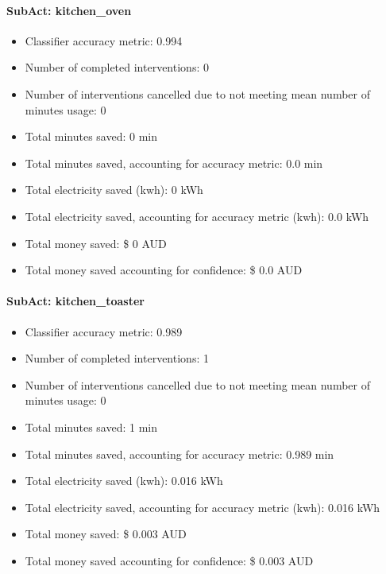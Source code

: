 \documentclass[11pt,]{article}
\providecommand{\tightlist}{%
  \setlength{\itemsep}{0pt}\setlength{\parskip}{0pt}}
\let\oldparagraph\paragraph
\renewcommand{\paragraph}[1]{\oldparagraph{#1}\mbox{}}
\begin{document}
\hypertarget{subact-kitchen_oven}{%
\paragraph{SubAct: kitchen\_oven}\label{subact-kitchen_oven}}

\begin{itemize}
\tightlist
\item
  Classifier accuracy metric: 0.994
\item
  Number of completed interventions: 0
\item
  Number of interventions cancelled due to not meeting mean number of
  minutes usage: 0
\item
  Total minutes saved: 0 min
\item
  Total minutes saved, accounting for accuracy metric: 0.0 min
\item
  Total electricity saved (kwh): 0 kWh
\item
  Total electricity saved, accounting for accuracy metric (kwh): 0.0 kWh
\item
  Total money saved: \$ 0 AUD
\item
  Total money saved accounting for confidence: \$ 0.0 AUD
\end{itemize}

\hypertarget{subact-kitchen_toaster}{%
\paragraph{SubAct: kitchen\_toaster}\label{subact-kitchen_toaster}}

\begin{itemize}
\tightlist
\item
  Classifier accuracy metric: 0.989
\item
  Number of completed interventions: 1
\item
  Number of interventions cancelled due to not meeting mean number of
  minutes usage: 0
\item
  Total minutes saved: 1 min
\item
  Total minutes saved, accounting for accuracy metric: 0.989 min
\item
  Total electricity saved (kwh): 0.016 kWh
\item
  Total electricity saved, accounting for accuracy metric (kwh): 0.016
  kWh
\item
  Total money saved: \$ 0.003 AUD
\item
  Total money saved accounting for confidence: \$ 0.003 AUD
\end{itemize}
\end{document}
